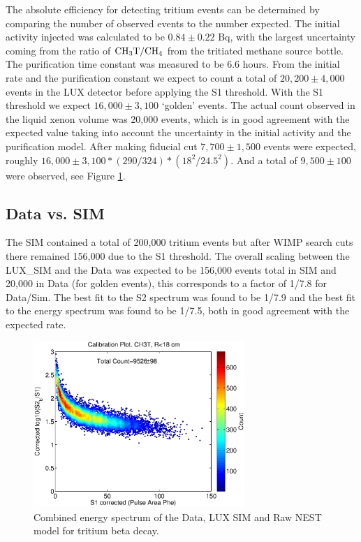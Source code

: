 The absolute efficiency for detecting tritium events can be determined by comparing the number of observed events to the number expected. The initial activity injected was calculated to be $0.84 \pm 0.22 $ Bq, with the largest uncertainty coming from the ratio of $\rm CH_3T/CH_4$ from the tritiated methane source bottle. The purification time constant was measured to be 6.6 hours. From the initial rate and the purification constant we expect to count a total of $20,200 \pm 4,000 $ events in the LUX detector before applying the S1 threshold. With the S1 threshold we expect  $16,000 \pm 3,100 $ `golden' events. The actual count observed in the liquid xenon volume was 20,000 events, which is in good agreement with the expected value taking into account the uncertainty in the initial activity and the purification model. After making fiducial cut $7,700 \pm  1,500$ events were expected,  roughly $16,000 \pm  3,100 * (290/324)*(18^2/24.5^2)$. And a total of $9,500 \pm 100$ were observed, see Figure \ref{fig:Count}.

\subsection{Data vs. SIM}

The SIM contained a total of 200,000 tritium events but after WIMP search cuts there remained 156,000 due to the S1 threshold. The overall scaling between the LUX\_SIM and the Data was expected to be 156,000 events total in SIM and 20,000 in Data (for golden events), this corresponds to a factor of 1/7.8 for Data/Sim. The best fit to the S2 spectrum was found to be 1/7.9 and the best fit to the energy spectrum was found to be 1/7.5, both in good agreement with the expected rate.
 

\begin{figure}[H]\centering
\includegraphics[width=80mm]{CH3T_all_lux10_20130813T1120_cp05328.eps}
\caption{Combined energy spectrum of the Data, LUX SIM and Raw NEST model for tritium beta decay.}
\label{fig:Count}
\end{figure}


